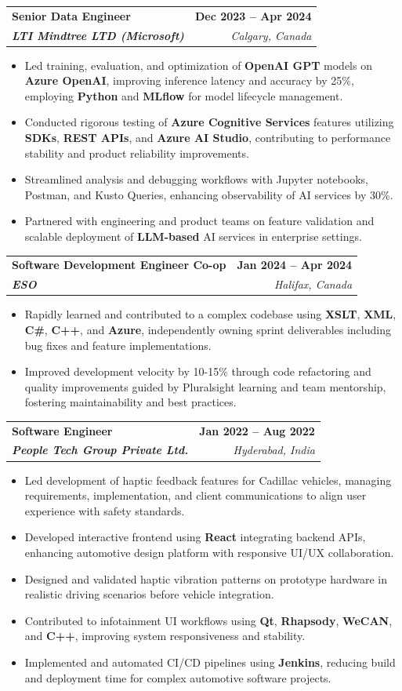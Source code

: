 \documentclass[letterpaper,11pt]{article}
\makeatletter
\newcommand{\resumeItem}[1]{
  \item\small{
    {#1 \vspace{-2pt}}
  }
}
\newcommand{\resumeSubheading}[4]{
  \vspace{-2pt}\item
    \begin{tabular*}{1.0\textwidth}[t]{l@{\extracolsep{\fill}}r}
      \textbf{#1} & \textbf{\small #2} \\
      \textit{\small#3} & \textit{\small #4} \\
    \end{tabular*}\vspace{-7pt}
}
\newcommand{\resumeItemListStart}{\begin{itemize}}
\newcommand{\resumeItemListEnd}{\end{itemize}\vspace{-5pt}}
\makeatother
\begin{document}
    \resumeSubheading
      {\textbf{Senior Data Engineer}}{\textbf{Dec 2023 -- Apr 2024}}
      {\textbf{LTI Mindtree LTD (Microsoft)}}{Calgary, Canada}
      \resumeItemListStart
        \resumeItem{Led training, evaluation, and optimization of \textbf{OpenAI GPT} models on \textbf{Azure OpenAI}, improving inference latency and accuracy by 25\%, employing \textbf{Python} and \textbf{MLflow} for model lifecycle management.}
        \resumeItem{Conducted rigorous testing of \textbf{Azure Cognitive Services} features utilizing \textbf{SDKs}, \textbf{REST APIs}, and \textbf{Azure AI Studio}, contributing to performance stability and product reliability improvements.}
        \resumeItem{Streamlined analysis and debugging workflows with Jupyter notebooks, Postman, and Kusto Queries, enhancing observability of AI services by 30\%.}
        \resumeItem{Partnered with engineering and product teams on feature validation and scalable deployment of \textbf{LLM-based} AI services in enterprise settings.}
      \resumeItemListEnd
    
    \resumeSubheading
      {\textbf{Software Development Engineer Co-op}}{\textbf{Jan 2024 -- Apr 2024}}
      {\textbf{ESO}}{Halifax, Canada}
      \resumeItemListStart
        \resumeItem{Rapidly learned and contributed to a complex codebase using \textbf{XSLT}, \textbf{XML}, \textbf{C\#}, \textbf{C++}, and \textbf{Azure}, independently owning sprint deliverables including bug fixes and feature implementations.}
        \resumeItem{Improved development velocity by 10-15\% through code refactoring and quality improvements guided by Pluralsight learning and team mentorship, fostering maintainability and best practices.}
      \resumeItemListEnd

    \resumeSubheading
      {\textbf{Software Engineer}}{\textbf{Jan 2022 -- Aug 2022}}
      {\textbf{People Tech Group Private Ltd.}}{Hyderabad, India}
      \resumeItemListStart
        \resumeItem{Led development of haptic feedback features for Cadillac vehicles, managing requirements, implementation, and client communications to align user experience with safety standards.}
        \resumeItem{Developed interactive frontend using \textbf{React} integrating backend APIs, enhancing automotive design platform with responsive UI/UX collaboration.}
        \resumeItem{Designed and validated haptic vibration patterns on prototype hardware in realistic driving scenarios before vehicle integration.}
        \resumeItem{Contributed to infotainment UI workflows using \textbf{Qt}, \textbf{Rhapsody}, \textbf{WeCAN}, and \textbf{C++}, improving system responsiveness and stability.}
        \resumeItem{Implemented and automated CI/CD pipelines using \textbf{Jenkins}, reducing build and deployment time for complex automotive software projects.}
      \resumeItemListEnd
\end{document}
